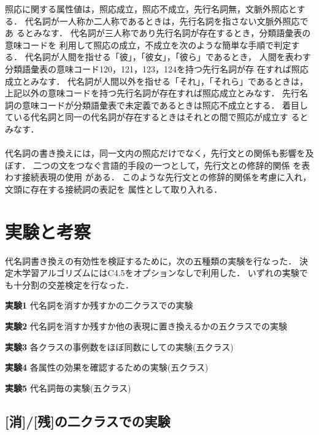 照応に関する属性値は，照応成立，照応不成立，先行名詞無，文脈外照応とする．
代名詞が一人称か二人称であるときは，先行名詞を指さない文脈外照応であ
るとみなす．
代名詞が三人称であり先行名詞が存在するとき，分類語彙表の意味コードを
利用して照応の成立，不成立を次のような簡単な手順で判定する．
代名詞が人間を指せる「彼」，「彼女」，「彼ら」であるとき，
人間を表わす分類語彙表の意味コード120，121，123，124を持つ先行名詞が存
在すれば照応成立とみなす．
代名詞が人間以外を指せる「それ」，「それら」であるときは，
上記以外の意味コードを持つ先行名詞が存在すれば照応成立とみなす．
先行名詞の意味コードが分類語彙表で未定義であるときは照応不成立とする．
着目している代名詞と同一の代名詞が存在するときはそれとの間で照応が成立す
るとみなす．

\paragraph{\CONJ}

代名詞の書き換えには，同一文内の照応だけでなく，先行文との関係も影響を及
ぼす．
二つの文をつなぐ言語的手段の一つとして，先行文との修辞的関係
\cite{Cohen84,Mann84,Knott94}を表わす接続表現の使用
がある\cite{Halliday76}．
このような先行文との修辞的関係を考慮に入れ，文頭に存在する接続詞の表記を
属性として取り入れる．

\section{実験と考察}
\label{sec:experiment}

代名詞書き換えの有効性を検証するために，次の五種類の実験を行なった．
決定木学習アルゴリズムにはC4.5をオプションなしで利用した．
いずれの実験でも十分割の交差検定を行なった．
\begin{LIST}
\item[\bf 実験1] 代名詞を消すか残すかの二クラスでの実験
\item[\bf 実験2] 代名詞を消すか残すか他の表現に置き換えるかの五クラスでの実験
\item[\bf 実験3] 各クラスの事例数をほぼ同数にしての実験(五クラス)
\item[\bf 実験4] 各属性の効果を確認するための実験(五クラス)
\item[\bf 実験5] 代名詞毎の実験(五クラス)
\end{LIST}

\subsection{[消]/[残]の二クラスでの実験}
\label{sec:experiment:binary}

